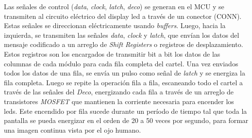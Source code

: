 Las señales de control (\textit{data}, \textit{clock}, \textit{latch}, \textit{deco}) se generan en el MCU y se transmiten al circuito eléctrico del display led a través de un conector (CONN). Estas señales se direccionan eléctricamente usando \textit{buffers}. Luego, hacia la izquierda, se transmiten las señales \textit{data}, \textit{clock} y \textit{latch}, que envían los datos del mensaje codificado a un arreglo de \textit{Shift Registers} o registros de desplazamiento. Estos registros son los encargados de transmitir bit a bit los datos de las columnas de cada módulo para cada fila completa del cartel. Una vez enviados todos los datos de una fila, se envía un pulso como señal de \textit{latch} y se energiza la fila completa. Luego se repite la operación fila a fila, escaneando todo el cartel a través de las señales del \textit{Deco}, energizando cada fila a través de un arreglo de transistores \textit{MOSFET} que mantienen la corriente necesaria para encender los leds. Este encendido por fila sucede durante un período de tiempo tal que toda la pantalla se pueda energizar en el orden de 20 a 50 veces por segundo, para formar una imagen continua vista por el ojo humano.\\

